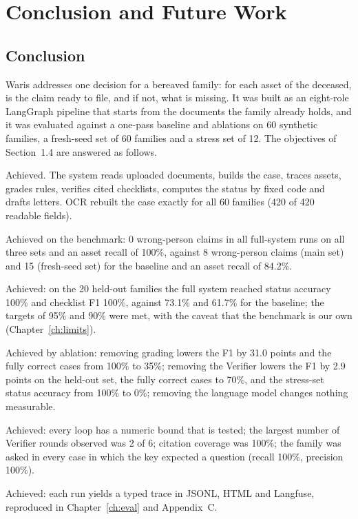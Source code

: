 \chapter{Conclusion and Future Work}\label{ch:concl}
\section{Conclusion}
Waris addresses one decision for a bereaved family: for each asset of the deceased, is the claim ready to file, and if not, what is missing. It was built as an eight-role LangGraph pipeline that starts from the documents the family already holds, and it was evaluated against a one-pass baseline and ablations on 60 synthetic families, a fresh-seed set of 60 families and a stress set of 12. The objectives of Section~1.4 are answered as follows.

\begin{description}[leftmargin=1.4cm,labelwidth=1.1cm,itemsep=3pt]
\item[O1 (end-to-end workflow)] Achieved. The system reads uploaded documents, builds the case, traces assets, grades rules, verifies cited checklists, computes the status by fixed code and drafts letters. OCR rebuilt the case exactly for all 60 families (420 of 420 readable fields).
\item[O2 (safety of identity and recall)] Achieved on the benchmark: 0 wrong-person claims in all full-system runs on all three sets and an asset recall of 100\%, against 8 wrong-person claims (main set) and 15 (fresh-seed set) for the baseline and an asset recall of 84.2\%.
\item[O3 (accuracy against a baseline)] Achieved: on the 20 held-out families the full system reached status accuracy 100\% and checklist F1 100\%, against 73.1\% and 61.7\% for the baseline; the targets of 95\% and 90\% were met, with the caveat that the benchmark is our own (Chapter~\ref{ch:limits}).
\item[O4 (contribution of components)] Achieved by ablation: removing grading lowers the F1 by 31.0 points and the fully correct cases from 100\% to 35\%; removing the Verifier lowers the F1 by 2.9 points on the held-out set, the fully correct cases to 70\%, and the stress-set status accuracy from 100\% to 0\%; removing the language model changes nothing measurable.
\item[O5 (bounded and cited)] Achieved: every loop has a numeric bound that is tested; the largest number of Verifier rounds observed was 2 of 6; citation coverage was 100\%; the family was asked in every case in which the key expected a question (recall 100\%, precision 100\%).
\item[O6 (observability)] Achieved: each run yields a typed trace in JSONL, HTML and Langfuse, reproduced in Chapter~\ref{ch:eval} and Appendix~C.
\end{description}


